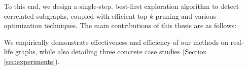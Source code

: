 
To this end, we design a single-step, best-first exploration algorithm to detect correlated subgraphs,
coupled with efficient top-$k$ pruning and various optimization techniques.
The main contributions of this thesis are as follows:
\squishlist
\item 
\item
\item
\item We empirically demonstrate effectiveness and efficiency of our methods on real-life graphs,
while also detailing three concrete case studies (Section \ref{sec:experiments}).
\squishend

